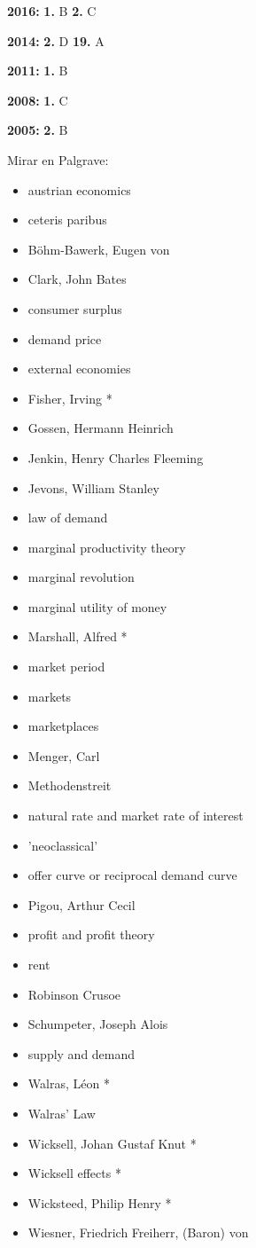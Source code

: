 \documentclass{nuevotema}
\begin{document}
\textbf{2016:} \textbf{1.} B \textbf{2.} C

\textbf{2014:} \textbf{2.} D \textbf{19.} A

\textbf{2011:} \textbf{1.} B

\textbf{2008:} \textbf{1.} C

\textbf{2005:} \textbf{2.} B

\bibliografia

Mirar en Palgrave:
\begin{itemize}
	\item austrian economics
	\item ceteris paribus
	\item Böhm-Bawerk, Eugen von
	\item Clark, John Bates
	\item consumer surplus
	\item demand price
	\item external economies
	\item Fisher, Irving *
	\item Gossen, Hermann Heinrich
	\item Jenkin, Henry Charles Fleeming
	\item Jevons, William Stanley
	\item law of demand
	\item marginal productivity theory
	\item marginal revolution
	\item marginal utility of money
	\item Marshall, Alfred *
	\item market period
	\item markets
	\item marketplaces
	\item Menger, Carl
	\item Methodenstreit
	\item natural rate and market rate of interest
	\item 'neoclassical'
	\item offer curve or reciprocal demand curve
	\item Pigou, Arthur Cecil
	\item profit and profit theory
	\item rent
	\item Robinson Crusoe
	\item Schumpeter, Joseph Alois
	\item supply and demand
	\item Walras, Léon *
	\item Walras' Law
	\item Wicksell, Johan Gustaf Knut *
	\item Wicksell effects *
	\item Wicksteed, Philip Henry *
	\item Wiesner, Friedrich Freiherr, (Baron) von
\end{itemize}
\end{document}
